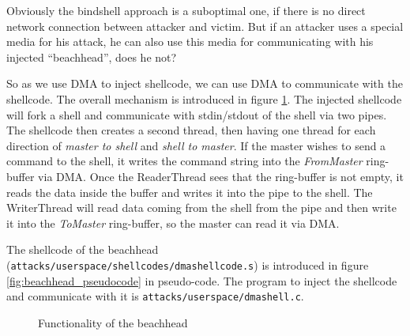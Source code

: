 Obviously the bindshell approach is a suboptimal one, if there is no direct
network connection between attacker and victim. But if an attacker uses a
special media for his attack, he can also use this media for communicating with
his injected ``beachhead'', does he not?

So as we use DMA to inject shellcode, we can use DMA to communicate with the
shellcode. The overall mechanism is introduced in figure
\ref{fig:functionality_beachhead}. The injected shellcode will fork a shell and
communicate with stdin/stdout of the shell via two pipes. The shellcode then
creates a second thread, then having one thread for each direction of
\emph{master to shell} and \emph{shell to master}. If the master wishes to send
a command to the shell, it writes the command string into the \emph{FromMaster}
ring-buffer via DMA.  Once the ReaderThread sees that the ring-buffer is not
empty, it reads the data inside the buffer and writes it into the pipe to the
shell.  The WriterThread will read data coming from the shell from the pipe and
then write it into the \emph{ToMaster} ring-buffer, so the master can read it
via DMA.

The shellcode of the beachhead
(\texttt{attacks/userspace/shellcodes/dmashellcode.s}) is introduced in figure
\ref{fig:beachhead_pseudocode} in pseudo-code. The program to inject the
shellcode and communicate with it is \texttt{attacks/userspace/dmashell.c}.

\begin{figure}[ht] \begin{center}

	\epsfysize 6cm


	\caption{Functionality of the beachhead}

	\label{fig:functionality_beachhead}

\end{center}\end{figure}


